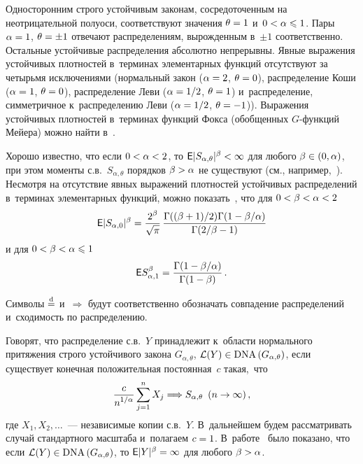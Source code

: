 \begin{multicols}{2}
Односторонним строго устойчивым законам, сосредоточенным на
неотрицательной полуоси, соответствуют значения $\theta\hm=1$ 
и~$0\hm<\alpha\hm\leqslant1$. Пары $\alpha\hm=1$, $\theta\hm=\pm1$ отвечают
распределениям, вы\-рож\-ден\-ным в~$\pm1$ соответственно. Остальные
устойчивые распределения абсолютно непрерывны. Явные выражения
устойчивых плотностей в~терминах элементарных функций отсутствуют за
четырьмя исключениями (нормальный закон ($\alpha\hm=2$, $\theta\hm=0$),
распределение Коши ($\alpha\hm=1$, $\theta\hm=0$), распределение Леви
($\alpha\hm=1/2$, $\theta\hm=1$) и~распределение, симметричное 
к~распределению Леви ($\alpha\hm=1/2$, $\theta\hm=-1$)). Выражения
устойчивых плотностей в~терминах функций Фокса (обобщенных
$G$-функ\-ций Мейера) можно найти в~\cite{Schneider1986, UchaikinZolotarev1999}.

Хорошо известно, что если $0\hm<\alpha\hm<2$, 
то ${\sf E}|S_{\alpha,\theta}|^{\beta}\hm<\infty$ для любого
$\beta\hm\in(0,\alpha)$, при этом моменты с.в.~$S_{\alpha,\theta}$ порядков
$\beta\hm>\alpha$ не существуют (см., например,~\cite{Zolotarev1983}).
Несмотря на отсутствие явных выражений плотностей устойчивых
распределений в~терминах элементарных функций, можно 
показать~\cite{KorolevWeibull2016}, что для $0\hm<\beta\hm<\alpha\hm<2$
$$
{\sf E}|S_{\alpha,0}|^{\beta}=\displaystyle\frac{\displaystyle 2^{\beta}\mathstrut}{\displaystyle \sqrt{\pi}\mathstrut}\,
\displaystyle\frac{\displaystyle \Gamma(({\beta+1})/{2})\Gamma(1-{\beta}/{\alpha})\mathstrut}{\displaystyle \Gamma({2}/{\beta}-1)\mathstrut}
$$
и для $0<\beta<\alpha\hm\leqslant 1$
$$
{\sf
E}S_{\alpha,1}^{\beta}=\displaystyle\frac{\displaystyle \Gamma(1-{\beta}/{\alpha})\mathstrut}{\displaystyle \Gamma(1-\beta)\mathstrut}\,.
$$

Символы $\stackrel{\mathrm{d}}{=}$ и~$\Longrightarrow$ будут соответственно обозначать
совпадение распределений и~сходимость по распределению.

Говорят, что распределение с.в.~$Y$ принадлежит 
к~области нормального притяжения строго устойчивого закона
$G_{\alpha,\theta}$, $\mathcal{L}(Y)\hm\in \mathrm{DNA}\left(G_{\alpha,\theta}\right)$,
если существует конечная положительная постоянная~$c$ та\-кая,~что
$$
\displaystyle\frac{\displaystyle c\mathstrut}{\displaystyle n^{1/\alpha}\mathstrut}\sum\limits_{j=1}^nX_j\Longrightarrow
S_{\alpha,\theta}\enskip (n\to\infty)\,,
$$
где $X_1,X_2,\ldots$~--- независимые копии с.в.~$Y$. В~дальнейшем
будем рассматривать случай стандартного масштаба и~полагаем $c\hm=1$. 
В~работе~\cite{Tucker1975} было показано, что если $\mathcal{L}(Y)\hm\in
\mathrm{DNA}\left(G_{\alpha,\theta}\right)$, то ${\sf E}|Y|^{\beta}\hm=\infty$ для любого
$\beta\hm>\alpha$.


\end{multicols}
